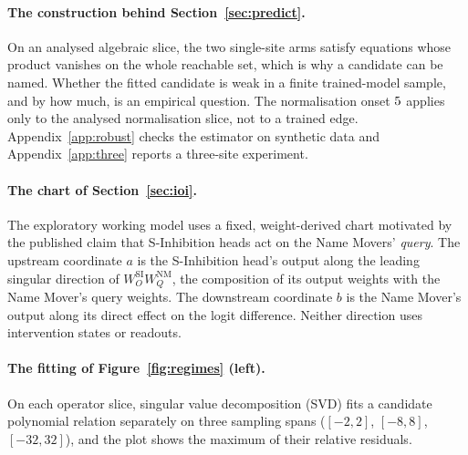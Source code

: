 \paragraph{The construction behind Section~\ref{sec:predict}.} On an analysed algebraic slice, the two single-site arms satisfy equations whose
product vanishes on the whole reachable set, which is why a candidate can be named. Whether the fitted candidate is weak
in a finite trained-model sample, and by how much, is an empirical question. The normalisation onset $5$ applies
only to the analysed normalisation slice, not to a trained edge. Appendix~\ref{app:robust} checks the estimator on
synthetic data and Appendix~\ref{app:three} reports a three-site experiment.

\paragraph{The chart of Section~\ref{sec:ioi}.} The exploratory working model uses a fixed, weight-derived chart motivated by the published claim that S-Inhibition heads act on the Name Movers' \emph{query}. The upstream coordinate $a$ is the S-Inhibition head's output along the leading singular direction of $W_O^{\mathrm{SI}}W_Q^{\mathrm{NM}}$, the composition of its output weights with the Name Mover's query weights. The downstream coordinate $b$ is the Name Mover's output along its direct effect on the logit difference. Neither direction uses intervention states or readouts.

\paragraph{The fitting of Figure~\ref{fig:regimes} (left).} On each operator slice, singular value decomposition (SVD) fits a candidate polynomial relation separately on three sampling spans ($[-2,2]$, $[-8,8]$, $[-32,32]$), and the plot shows the maximum of their relative residuals.

